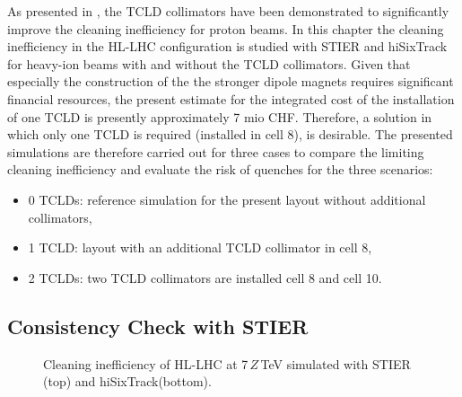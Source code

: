 As presented in \cite{Bruce2014}, the TCLD collimators have been demonstrated to significantly improve the cleaning inefficiency for proton beams. In this chapter the cleaning inefficiency in the HL-LHC configuration is studied with STIER and hiSixTrack for heavy-ion beams with and without the TCLD collimators. Given that especially the construction of the the stronger dipole magnets requires significant financial resources, the present estimate for the integrated cost of the installation of one TCLD is presently approximately 7 mio CHF. Therefore, a solution in which only one TCLD is required (installed in cell 8), is desirable. The presented  simulations are therefore carried out for three cases to compare the limiting cleaning inefficiency and evaluate the risk of quenches for the three scenarios:
%
\begin{itemize}
  \item 0 TCLDs: reference simulation for the present layout without additional collimators,
  \item 1 TCLD: layout with an additional TCLD collimator in cell 8, 
  \item 2 TCLDs: two TCLD collimators are installed cell 8 and cell 10. 
\end{itemize}
%




\subsection{Consistency Check with STIER}


\begin{figure}[t]
  \centering
  \caption{Cleaning inefficiency of HL-LHC at 7$\,Z\,$TeV simulated with STIER (top) and hiSixTrack(bottom).}  
  \label{pic:16072301}
  \end{figure}

